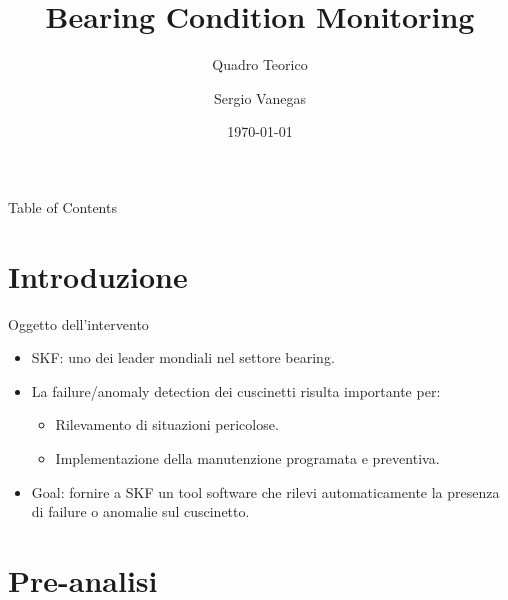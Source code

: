 \documentclass{beamer}
\title{Bearing Condition Monitoring}
\subtitle{Quadro Teorico}
\author{Sergio Vanegas}
\institute{Modelway S.r.l.}
\date{\today}
\begin{document}
\frame{\titlepage}

\begin{frame}{Table of Contents}
    \tableofcontents
\end{frame}

\section{Introduzione}

\begin{frame}{Oggetto dell'intervento}
    \begin{itemize}
        \item SKF: uno dei leader mondiali nel settore bearing.
        \item La failure/anomaly detection dei cuscinetti risulta importante per:
        \begin{itemize}
            \item Rilevamento di situazioni pericolose.
            \item Implementazione della manutenzione programata e preventiva.
        \end{itemize}
        \item Goal: fornire a SKF un tool software che rilevi automaticamente la presenza di failure o anomalie sul cuscinetto.
    \end{itemize}
\end{frame}

\section{Pre-analisi}
\end{document}

